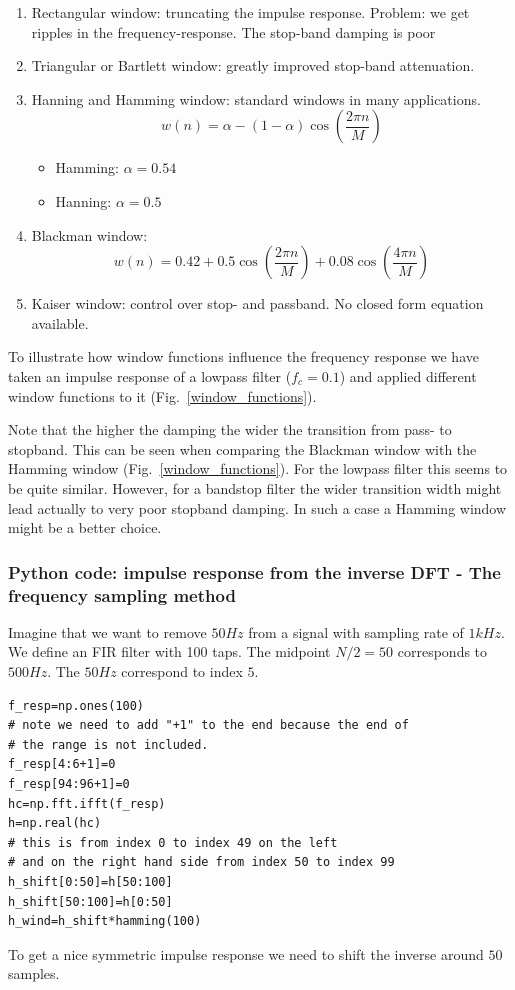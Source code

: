 \documentclass[12pt,a4paper]{article}
\begin{document}
\begin{enumerate}
\item Rectangular window: truncating the impulse response.
Problem: we get ripples in the frequency-response.
The stop-band damping is poor

\item Triangular or Bartlett window: greatly improved stop-band attenuation.
\item Hanning and Hamming window: standard windows in many applications.
\begin{equation}
w(n) = \alpha - (1-\alpha) \cos\left(\frac{2\pi n}{M}\right)
\end{equation}
\begin{itemize}
\item Hamming: $\alpha = 0.54$
\item Hanning: $\alpha = 0.5$
\end{itemize}

\item Blackman window:
\begin{equation}
w(n) = 0.42 + 0.5 \cos \left(\frac{2 \pi n}{M}\right) + 
0.08 \cos \left( \frac{4 \pi n}{M} \right) 
\end{equation}
\item Kaiser window: control over stop- and passband. No closed form
equation available.
\end{enumerate}
To illustrate how window functions influence the frequency response
we have taken an impulse response of a lowpass filter ($f_c=0.1$)
and applied different window functions to it (Fig.~\ref{window_functions}).

Note that the higher the damping the wider the transition from pass-
to stopband. This can be seen when comparing the Blackman window with
the Hamming window (Fig.~\ref{window_functions}). For the lowpass
filter this seems to be quite similar. However, for a bandstop filter
the wider transition width might lead actually to very poor stopband
damping. In such a case a Hamming window might be a better choice.


\subsubsection{Python code: 
impulse response from the inverse DFT - The frequency sampling
method\label{freqsamp}} Imagine that we want to remove $50Hz$ from a
signal with sampling rate of $1kHz$. We define an FIR filter with 100
taps. The midpoint $N/2=50$ corresponds to $500Hz$. The $50Hz$
correspond to index $5$.
\begin{verbatim}
f_resp=np.ones(100)
# note we need to add "+1" to the end because the end of
# the range is not included.
f_resp[4:6+1]=0
f_resp[94:96+1]=0
hc=np.fft.ifft(f_resp)
h=np.real(hc)
# this is from index 0 to index 49 on the left
# and on the right hand side from index 50 to index 99
h_shift[0:50]=h[50:100]
h_shift[50:100]=h[0:50]
h_wind=h_shift*hamming(100)
\end{verbatim}
To get a nice symmetric impulse response we need to shift the
inverse around $50$ samples.
\end{document}
